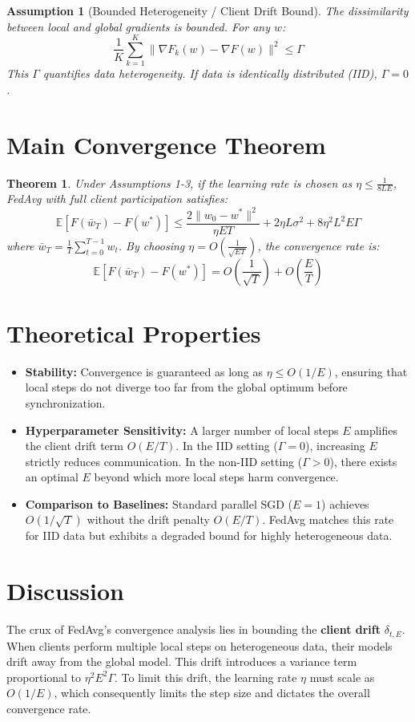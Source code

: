 \documentclass{article}
\newtheorem{theorem}{Theorem}
\newtheorem{assumption}{Assumption}
\begin{document}
\begin{assumption}[Bounded Heterogeneity / Client Drift Bound]
The dissimilarity between local and global gradients is bounded. For any $w$:
$$ \frac{1}{K}\sum_{k=1}^K \|\nabla F_k(w) - \nabla F(w)\|^2 \leq \Gamma $$
This $\Gamma$ quantifies data heterogeneity. If data is identically distributed (IID), $\Gamma = 0$.
\end{assumption}

\section*{Main Convergence Theorem}
\begin{theorem}
Under Assumptions 1-3, if the learning rate is chosen as $\eta \leq \frac{1}{8LE}$, FedAvg with full client participation satisfies:
$$ \mathbb{E}[F(\bar{w}_T) - F(w^*)] \leq \frac{2\|w_0 - w^*\|^2}{\eta ET} + 2\eta L \sigma^2 + 8\eta^2 L^2 E \Gamma $$
where $\bar{w}_T = \frac{1}{T}\sum_{t=0}^{T-1} w_t$. By choosing $\eta = O\left(\frac{1}{\sqrt{ET}}\right)$, the convergence rate is:
$$ \mathbb{E}[F(\bar{w}_T) - F(w^*)] = O\left(\frac{1}{\sqrt{T}}\right) + O\left(\frac{E}{T}\right) $$
\end{theorem}

\section*{Theoretical Properties}
\begin{itemize}
\item \textbf{Stability:} Convergence is guaranteed as long as $\eta \leq O(1/E)$, ensuring that local steps do not diverge too far from the global optimum before synchronization.
\item \textbf{Hyperparameter Sensitivity:} A larger number of local steps $E$ amplifies the client drift term $O(E/T)$. In the IID setting ($\Gamma=0$), increasing $E$ strictly reduces communication. In the non-IID setting ($\Gamma>0$), there exists an optimal $E$ beyond which more local steps harm convergence.
\item \textbf{Comparison to Baselines:} Standard parallel SGD ($E=1$) achieves $O(1/\sqrt{T})$ without the drift penalty $O(E/T)$. FedAvg matches this rate for IID data but exhibits a degraded bound for highly heterogeneous data.
\end{itemize}

\section*{Discussion}
The crux of FedAvg's convergence analysis lies in bounding the \textbf{client drift} $\delta_{t,E}$. When clients perform multiple local steps on heterogeneous data, their models drift away from the global model. This drift introduces a variance term proportional to $\eta^2 E^2 \Gamma$. To limit this drift, the learning rate $\eta$ must scale as $O(1/E)$, which consequently limits the step size and dictates the overall convergence rate.
\end{document}
